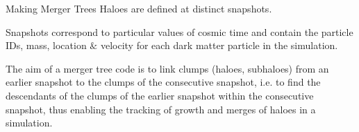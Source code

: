 \begin{frame}{Making Merger Trees}
    Haloes are defined at distinct snapshots. 
    
    Snapshots correspond to particular values of cosmic time and contain the particle IDs, mass, location $\&$ velocity for each dark matter particle in the simulation.
    
    The aim of a merger tree code is to link clumps (haloes, subhaloes) from an earlier snapshot to the clumps of the consecutive snapshot, i.e. to find the descendants of the clumps of the earlier snapshot within the consecutive snapshot, thus enabling the tracking of growth and merges of haloes in a simulation.
\end{frame}



